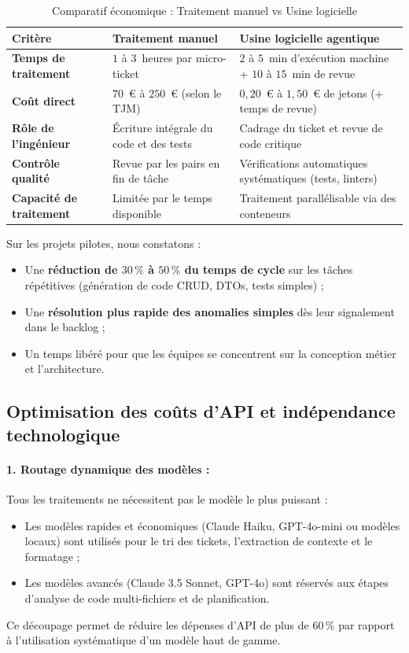 \documentclass{tnreport}
\begin{document}
\begin{table}[htbp]
\centering
\caption{Comparatif économique : Traitement manuel vs Usine logicielle}
\label{tab:comparatif_economique}
\small
\begin{tabularx}{\textwidth}{|l|X|X|}
\hline
\textbf{Critère} & \textbf{Traitement manuel} & \textbf{Usine logicielle agentique} \\
\hline
\textbf{Temps de traitement} & $1$ à $3$~heures par micro-ticket & $2$ à $5$~min d'exécution machine + $10$ à $15$~min de revue \\
\hline
\textbf{Coût direct} & $70$~€ à $250$~€ (selon le TJM) & $0{,}20$~€ à $1{,}50$~€ de jetons (+ temps de revue) \\
\hline
\textbf{Rôle de l'ingénieur} & Écriture intégrale du code et des tests & Cadrage du ticket et revue de code critique \\
\hline
\textbf{Contrôle qualité} & Revue par les pairs en fin de tâche & Vérifications automatiques systématiques (tests, linters) \\
\hline
\textbf{Capacité de traitement} & Limitée par le temps disponible & Traitement parallélisable via des conteneurs \\
\hline
\end{tabularx}
\end{table}

Sur les projets pilotes, nous constatons :
\begin{itemize}
    \item Une \textbf{réduction de $30\,\%$ à $50\,\%$ du temps de cycle} sur les tâches répétitives (génération de code CRUD, DTOs, tests simples) ;
    \item Une \textbf{résolution plus rapide des anomalies simples} dès leur signalement dans le backlog ;
    \item Un temps libéré pour que les équipes se concentrent sur la conception métier et l'architecture.
\end{itemize}

\subsection{Optimisation des coûts d'API et indépendance technologique}
\label{subsec:arbitrage_anti_lockin}

\paragraph{1. Routage dynamique des modèles :}
Tous les traitements ne nécessitent pas le modèle le plus puissant :
\begin{itemize}
    \item Les modèles rapides et économiques (Claude Haiku, GPT-4o-mini ou modèles locaux) sont utilisés pour le tri des tickets, l'extraction de contexte et le formatage ;
    \item Les modèles avancés (Claude 3.5 Sonnet, GPT-4o) sont réservés aux étapes d'analyse de code multi-fichiers et de planification.
\end{itemize}
Ce découpage permet de réduire les dépenses d'API de plus de $60\,\%$ par rapport à l'utilisation systématique d'un modèle haut de gamme.
\end{document}
